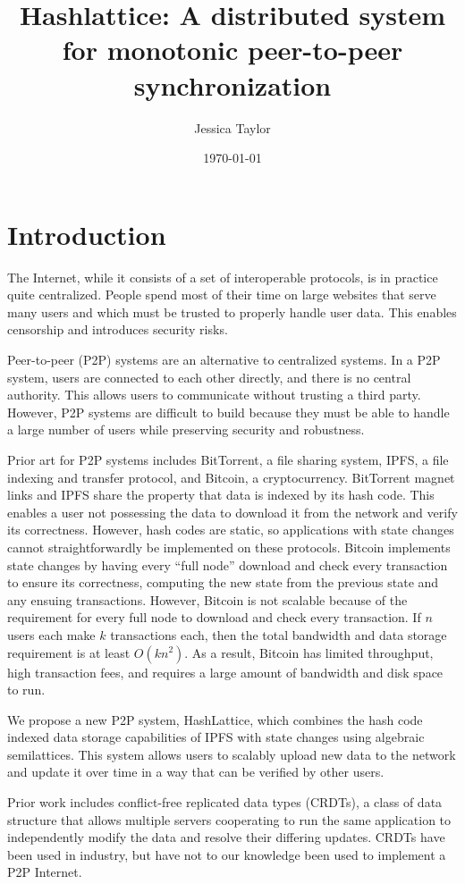 \documentclass{article}
\title{Hashlattice: A distributed system for monotonic peer-to-peer synchronization}
\author{Jessica Taylor}
\date{\today}
\begin{document}
  \maketitle
  
  \section{Introduction}
    The Internet, while it consists of a set of interoperable protocols, is in practice quite centralized. People spend most of their time on large websites that serve many users and which must be trusted to properly handle user data. This enables censorship and introduces security risks.

    Peer-to-peer (P2P) systems are an alternative to centralized systems. In a P2P system, users are connected to each other directly, and there is no central authority. This allows users to communicate without trusting a third party. However, P2P systems are difficult to build because they must be able to handle a large number of users while preserving security and robustness.

    Prior art for P2P systems includes BitTorrent, a file sharing system, IPFS, a file indexing and transfer protocol, and Bitcoin, a cryptocurrency. BitTorrent magnet links and IPFS share the property that data is indexed by its hash code. This enables a user not possessing the data to download it from the network and verify its correctness. However, hash codes are static, so applications with state changes cannot straightforwardly be implemented on these protocols. Bitcoin implements state changes by having every ``full node'' download and check every transaction to ensure its correctness, computing the new state from the previous state and any ensuing transactions. However, Bitcoin is not scalable because of the requirement for every full node to download and check every transaction. If $n$ users each make $k$ transactions each, then the total bandwidth and data storage requirement is at least $O(kn^2)$. As a result, Bitcoin has limited throughput, high transaction fees, and requires a large amount of bandwidth and disk space to run.

    We propose a new P2P system, HashLattice, which combines the hash code indexed data storage capabilities of IPFS with state changes using algebraic semilattices. This system allows users to scalably upload new data to the network and update it over time in a way that can be verified by other users.

    Prior work includes conflict-free replicated data types (CRDTs), a class of data structure that allows multiple servers cooperating to run the same application to independently modify the data and resolve their differing updates. CRDTs have been used in industry, but have not to our knowledge been used to implement a P2P Internet.
\end{document}

